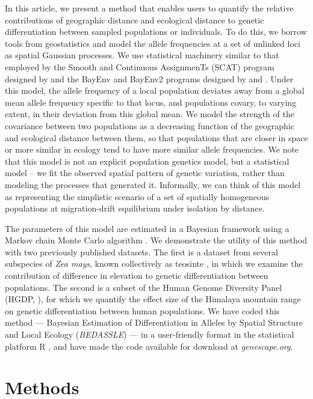 In this article, we present a method that enables users to quantify the relative contributions of geographic distance and ecological distance to genetic differentiation between sampled populations or individuals.  To do this, we borrow tools from geostatistics \citep{Diggle1998} and model the allele frequencies at a set of unlinked loci as spatial Gaussian processes.   We use statistical machinery similar to that employed by the Smooth and Continuous AssignmenTs (SCAT) program designed by \citep{Wasser2004} and the BayEnv and BayEnv2 programs designed by \citep{coop2010bayenv} and \citep{GuntherCoop2013}.  Under this model, the allele frequency of a local population deviates away from a global mean allele frequency specific to that locus, and populations covary, to varying extent, in their deviation from this global mean.  We model the strength of the covariance between two populations as a decreasing function of the geographic and ecological distance between them, so that populations that are closer in space or more similar in ecology tend to have more similar allele frequencies. 
We note that this model is not an explicit population genetics model, but a statistical model -- we fit the observed spatial pattern of genetic variation, rather than modeling the processes that generated it.
Informally, we can think of this model as representing the simplistic scenario of a set of spatially homogeneous populations 
at migration-drift equilibrium under isolation by distance.


The parameters of this model are estimated in a Bayesian framework using a Markov chain Monte Carlo algorithm \citep{Metropolis1953, Hastings1970}.  We demonstrate the utility of this method with two previously published datasets. The first is a dataset from several subspecies of \textit{Zea mays}, known collectively as teosinte \citep{Fang2012}, in which we examine the contribution of difference in elevation to genetic differentiation between populations. The second is a subset of the Human Genome Diversity Panel (HGDP, \citep{Conrad2006, Li2008}), for which we quantify the effect size of the Himalaya mountain range on genetic differentiation between human populations.  We have coded this method --- Bayesian Estimation of Differentiation in Alleles by Spatial Structure and Local Ecology (\emph{BEDASSLE}) --- in a user-friendly format in the statistical platform R \citep{R}, and have made the code available for download at \textit{genescape.org}.

\section*{Methods}

